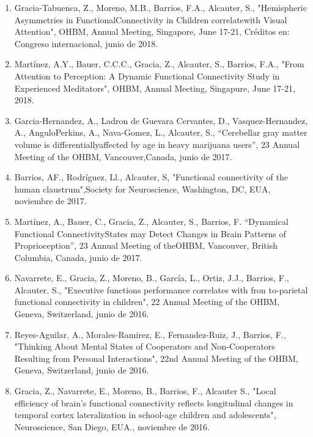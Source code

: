 \begin{enumerate}
\item Gracia-Tabuenca, Z., Moreno, M.B., Barrios, F.A., Alcauter, S., "Hemispheric Asymmetries in FunctionalConnectivity in 
Children correlatewith Visual Attention", OHBM, Annual Meeting, Singapore, June 17-21, Créditos en: Congreso internacional, 
junio de 2018.

\item Martínez, A.Y., Bauer, C.C.C., Gracia, Z., Alcauter, S., Barrios, F.A., "From Attention to Perception: A Dynamic 
Functional Connectivity Study in Experienced Meditators", OHBM, Annual Meeting, Singapure, June 17-21, 2018.

\item Garcia-Hernandez, A., Ladron de Guevara Cervantes, D., Vasquez-Hernandez, A., AnguloPerkins, A., Nava-Gomez, L., 
Alcauter, S., “Cerebellar gray matter volume is differentiallyaffected by age in heavy marijuana users”, 23 Annual Meeting 
of the OHBM, Vancouver,Canada, junio de 2017.

\item Barrios, AF., Rodríguez, Ll., Alcauter, S, "Functional connectivity of the human claustrum",Society for Neuroscience, 
Washington, DC, EUA, noviembre de 2017.

\item Martínez, A., Bauer, C., Gracia, Z., Alcauter, S., Barrios, F. “Dynamical Functional ConnectivityStates may Detect 
Changes in Brain Patterns of Proprioception”, 23 Annual Meeting of theOHBM, Vancouver, British Columbia, Canada, junio de 2017.

\item Navarrete, E., Gracia, Z., Moreno, B., García, L., Ortiz, J.J., Barrios, F., Alcauter, S., "Executive functions 
performance correlates with fron to-parietal functional connectivity in children", 22 Annual Meeting of the OHBM, Geneva, 
Switzerland, junio de 2016.

\item Reyes-Aguilar, A., Morales-Ramirez, E., Fernandez-Ruiz, J., Barrios, F., "Thinking About Mental States of Cooperators 
and Non-Cooperators Resulting from Personal Interactions", 22nd Annual Meeting of the OHBM, Geneva, Switzerland, junio de 2016.

\item Gracia, Z., Navarrete, E., Moreno, B., Barrios, F., Alcauter S., "Local efficiency of brain's functional connectivity 
reflects longitudinal changes in temporal cortex lateralization in school-age children and adolescents", Neuroscience, San 
Diego, EUA., noviembre de 2016.


\end{enumerate}
